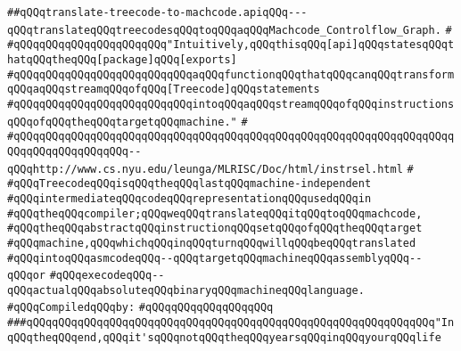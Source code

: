 \label{src/lib/compiler/back/low/treecode/translate-treecode-to-machcode.api}
\verb|##qQQqtranslate-treecode-to-machcode.apiqQQq---qQQqtranslateqQQqtreecodesqQQqtoqQQqaqQQqMachcode_Controlflow_Graph.|\newline
\verb|#|\newline
\verb|#qQQqqQQqqQQqqQQqqQQqqQQq"Intuitively,qQQqthisqQQq[api]qQQqstatesqQQqthatqQQqtheqQQq[package]qQQq[exports]|\newline
\verb|#qQQqqQQqqQQqqQQqqQQqqQQqqQQqaqQQqfunctionqQQqthatqQQqcanqQQqtransformqQQqaqQQqstreamqQQqofqQQq[Treecode]qQQqstatements|\newline
\verb|#qQQqqQQqqQQqqQQqqQQqqQQqqQQqintoqQQqaqQQqstreamqQQqofqQQqinstructionsqQQqofqQQqtheqQQqtargetqQQqmachine."|\newline
\verb|#|\newline
\verb|#qQQqqQQqqQQqqQQqqQQqqQQqqQQqqQQqqQQqqQQqqQQqqQQqqQQqqQQqqQQqqQQqqQQqqQQqqQQqqQQqqQQqqQQq--qQQqhttp://www.cs.nyu.edu/leunga/MLRISC/Doc/html/instrsel.html|\newline
\verb|#|\newline
\verb|#qQQqTreecodeqQQqisqQQqtheqQQqlastqQQqmachine-independent|\newline
\verb|#qQQqintermediateqQQqcodeqQQqrepresentationqQQqusedqQQqin|\newline
\verb|#qQQqtheqQQqcompiler;qQQqweqQQqtranslateqQQqitqQQqtoqQQqmachcode,|\newline
\verb|#qQQqtheqQQqabstractqQQqinstructionqQQqsetqQQqofqQQqtheqQQqtarget|\newline
\verb|#qQQqmachine,qQQqwhichqQQqinqQQqturnqQQqwillqQQqbeqQQqtranslated|\newline
\verb|#qQQqintoqQQqasmcodeqQQq--qQQqtargetqQQqmachineqQQqassemblyqQQq--qQQqor|\newline
\verb|#qQQqexecodeqQQq--qQQqactualqQQqabsoluteqQQqbinaryqQQqmachineqQQqlanguage.|\newline
\newline
\verb|#qQQqCompiledqQQqby:|\newline
\verb|#qQQqqQQqqQQqqQQqqQQq|\newline
\newline
\newline
\newline
\verb|###qQQqqQQqqQQqqQQqqQQqqQQqqQQqqQQqqQQqqQQqqQQqqQQqqQQqqQQqqQQqqQQq"InqQQqtheqQQqend,qQQqit'sqQQqnotqQQqtheqQQqyearsqQQqinqQQqyourqQQqlife|\newline
